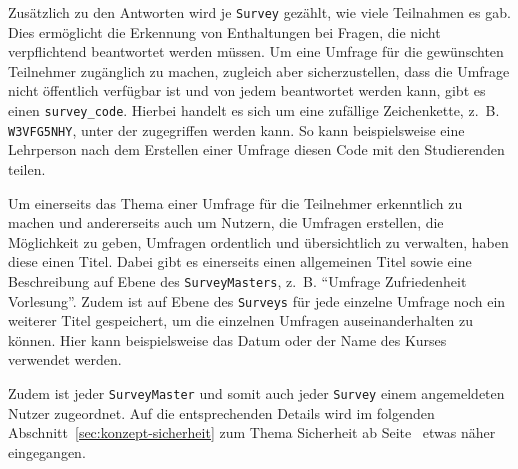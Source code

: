 Zusätzlich zu den Antworten wird je \texttt{Survey} gezählt, wie viele Teilnahmen es gab.
Dies ermöglicht die Erkennung von Enthaltungen bei Fragen, die nicht verpflichtend beantwortet werden müssen.
Um eine Umfrage für die gewünschten Teilnehmer zugänglich zu machen, zugleich aber sicherzustellen, dass die Umfrage nicht öffentlich verfügbar ist und von jedem beantwortet werden kann, gibt es einen \texttt{survey\_code}.
Hierbei handelt es sich um eine zufällige Zeichenkette, z.~B. \texttt{W3VFG5NHY}, unter der zugegriffen werden kann.
So kann beispielsweise eine Lehrperson nach dem Erstellen einer Umfrage diesen Code mit den Studierenden teilen.

Um einerseits das Thema einer Umfrage für die Teilnehmer erkenntlich zu machen und andererseits auch um Nutzern, die Umfragen erstellen, die Möglichkeit zu geben, Umfragen ordentlich und übersichtlich zu verwalten, haben diese einen Titel.
Dabei gibt es einerseits einen allgemeinen Titel sowie eine Beschreibung auf Ebene des \texttt{SurveyMasters}, z.~B. \enquote{Umfrage Zufriedenheit Vorlesung}.
Zudem ist auf Ebene des \texttt{Surveys} für jede einzelne Umfrage noch ein weiterer Titel gespeichert, um die einzelnen Umfragen auseinanderhalten zu können.
Hier kann beispielsweise das Datum oder der Name des Kurses verwendet werden.

Zudem ist jeder \texttt{SurveyMaster} und somit auch jeder \texttt{Survey} einem angemeldeten Nutzer zugeordnet.
Auf die entsprechenden Details wird im folgenden Abschnitt~\ref{sec:konzept-sicherheit} zum Thema Sicherheit ab Seite~\pageref{sec:authentifizierung} etwas näher eingegangen.
